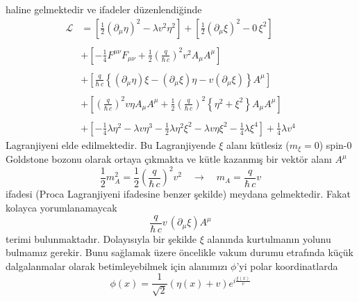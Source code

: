 haline gelmektedir ve ifadeler düzenlendiğinde
\begin{equation} \label{abe5}
\begin{aligned}
\mathcal{L} &= \left[ \frac{1}{2} \left( \partial_{\mu} \eta \right)^{2} - \lambda v^{2} \eta^{2} \right] + 
 \left[ \frac{1}{2} \left( \partial_{\mu} \xi \right)^{2} -  0\, \xi^{2} \right]  \\
 \\
 & + \left[ - \frac{1}{4} F^{\mu \nu} F_{\mu \nu} + \frac{1}{2} \left( \frac{q}{\hbar \, c}\right)^2 v^{2} A_{\mu} A^{\mu} \right] \\  
 \\
 & + \left[ \frac{q}{\hbar \, c} \left\lbrace \left( \partial_{\mu} \eta \right) \xi - \left( \partial_{\mu} \xi \right) \eta - v \left( \partial_{\mu} \xi \right) \right\rbrace A^{\mu} \right] \\
 \\
 & + \left[ \left( \frac{q}{ \hbar \, c} \right)^{2} v \eta A_{\mu} A^{\mu} +
  \frac{1}{2} \left( \frac{q}{ \hbar \, c} \right)^{2} \left\lbrace \eta^{2} + \xi^{2} \right\rbrace A_{\mu} A^{\mu} \right] \\
  \\
 & + \left[ - \frac{1}{4} \lambda \eta^{2} -  \lambda v \eta^{3} - \frac{1}{2} \lambda \eta^{2} \xi^{2} - \lambda v \eta \xi^{2} - \frac{1}{4} \lambda \xi^{4} \right]  + \frac{1}{4} \lambda v^{4}
\end{aligned}
\end{equation}
Lagranjiyeni elde edilmektedir. Bu Lagranjiyende $\xi$ alanı kütlesiz ($m_{\xi} = 0$) spin-0 Goldstone bozonu olarak ortaya çıkmakta ve kütle kazanmış bir vektör alanı $A^{\mu}$ 
\begin{equation} \label{abe6}
\frac{1}{2}m_{A}^{2} =  \frac{1}{2} \left( \frac{q}{\hbar \, c}\right)^2 v^{2}  \quad \to \quad m_{A} = \frac{q}{\hbar \, c} v
\end{equation}
ifadesi (Proca Lagranjiyeni ifadesine benzer şekilde) meydana gelmektedir. Fakat kolayca yorumlanamaycak
$$
\frac{q}{\hbar \, c} v \, \left(\partial_{\mu}\xi \right) A^{\mu}
$$
terimi bulunmaktadır. Dolayısıyla bir şekilde $\xi$ alanında kurtulmanın yolunu bulmamız gerekir. Bunu sağlamak üzere öncelikle   vakum durumu etrafında küçük dalgalanmalar olarak betimleyebilmek için alanımızı  $\phi$'yi polar koordinatlarda
\begin{equation} \label{abe7}
\phi(x) = \frac{1}{\sqrt{2}} \left( \eta (x) + v \right) e^{i \frac{\xi (x)}{v}}
\end{equation}
